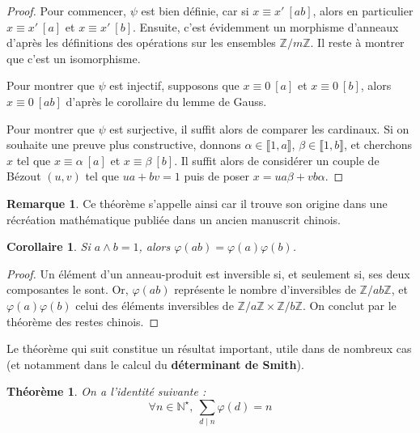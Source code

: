 \documentclass[french]{book}
\newcommand{\N}{\mathbb{N}}
\newcommand{\Z}{\mathbb{Z}}
\newcommand{\st}{^\star}
\theoremstyle{plain}
\newtheorem{thm}{Théorème}[chapter]
\newtheorem{cor}{Corollaire}[chapter]
\theoremstyle{definition}
\newtheorem{rmq}{Remarque}[chapter]
\theoremstyle{remark}
\begin{document}
\begin{proof}
	Pour commencer, $\psi$ est bien définie, car si $x\equiv x' \ [ab]$, alors en particulier $x\equiv x'\ [a]$ et $x\equiv x'\ [b]$. Ensuite, c'est évidemment un morphisme d'anneaux d'après les définitions des opérations sur les ensembles $\Z/m\Z$. Il reste à montrer que c'est un isomorphisme. \par Pour montrer que $\psi$ est injectif, supposons que $x\equiv 0\ [a]$ et  $x\equiv 0\ [b]$, alors $x\equiv 0\ [ab]$ d'après le corollaire du lemme de Gauss. \par Pour montrer que $\psi$ est surjective, il suffit alors de comparer les cardinaux. Si on souhaite une preuve plus constructive, donnons $\alpha\in\llbracket1,a\rrbracket$, $\beta\in\llbracket1,b\rrbracket$, et cherchons $x$ tel que $x\equiv\alpha\ [a]$ et $x\equiv\beta\ [b]$. Il suffit alors de considérer un couple de Bézout $(u,v)$ tel que $ua+bv=1$ puis de poser $x=ua\beta+vb\alpha$.
\end{proof}
\begin{rmq}
	Ce théorème s'appelle ainsi car il trouve son origine dans une récréation mathématique publiée dans un ancien manuscrit chinois.
\end{rmq}
\begin{cor}
	Si $a\wedge b=1$, alors $\varphi(ab)=\varphi(a)\varphi(b)$.
\end{cor}
\begin{proof}
	Un élément d'un anneau-produit est inversible si, et seulement si, ses deux composantes le sont. Or, $\varphi(ab)$ représente le nombre d'inversibles de $\Z/ab\Z$, et $\varphi(a)\varphi(b)$ celui des éléments inversibles de $\Z/a\Z\times\Z/b\Z$. On conclut par le théorème des restes chinois.
\end{proof}
Le théorème qui suit constitue un résultat important, utile dans de nombreux cas (et notamment dans le calcul du \textbf{déterminant de Smith}).
\begin{thm}
	On a l'identité suivante : $$\forall n\in\N\st,\ \sum_{d\mid n}\varphi(d)=n$$
\end{thm}
\end{document}
